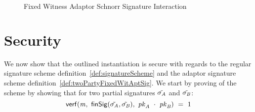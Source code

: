 \begin{figure}
    \caption{Fixed Witness Adaptor Schnorr Signature Interaction}
    \label{fig:aptSchnorrInteraction}
\end{figure}

\section{Security}\label{sec:twopartyAptSecurity}

We now show that the outlined instantiation is secure with regards to the regular signature scheme definition~\ref{def:signatureScheme} and the adaptor signature scheme definition~\ref{def:twoPartyFixedWitAptSig}.
We start by proving \cnstCorrectness of the scheme by showing that for two partial signatures $\tilde{\sigma_{\mathit{A}}}$ and $\tilde{\sigma_{\mathit{B}}}$:
\[ \mathsf{verf}(\mathit{m} ,~ \mathsf{finSig}(\tilde{\sigma_{\mathit{A}}},\tilde{\sigma_{\mathit{B}}}) ,~ \mathit{pk}_{\mathit{A}} ~\cdot~ \mathit{pk}_{\mathit{B}}) ~=~ 1 \]

